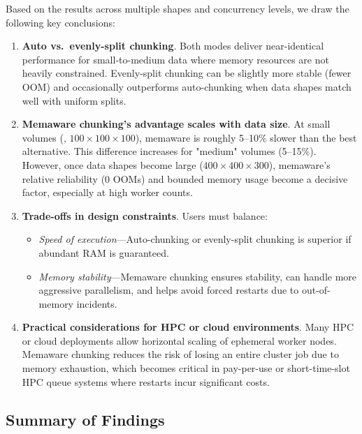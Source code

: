 Based on the results across multiple shapes and concurrency levels, we draw the following key conclusions:

\begin{enumerate}
    \item \textbf{Auto vs.\ evenly-split chunking}. Both modes deliver near-identical performance for small-to-medium data where memory resources are not heavily constrained. Evenly-split chunking can be slightly more stable (fewer \ac{OOM}) and occasionally outperforms auto-chunking when data shapes match well with uniform splits.

    \item \textbf{Memaware chunking's advantage scales with data size}. At small volumes (\eg, \(100 \times 100 \times 100\)), memaware is roughly 5--10\% slower than the best alternative. This difference increases for "medium" volumes (5--15\%). However, once data shapes become large (\(400 \times 400 \times 300\)), memaware's relative reliability (0 \ac{OOM}s) and bounded memory usage become a decisive factor, especially at high worker counts.

    \item \textbf{Trade-offs in design constraints}. Users must balance:
    \begin{itemize}
        \item \emph{Speed of execution}---Auto-chunking or evenly-split chunking is superior if abundant RAM is guaranteed.
        \item \emph{Memory stability}---Memaware chunking ensures stability, can handle more aggressive parallelism, and helps avoid forced restarts due to out-of-memory incidents.
    \end{itemize}

    \item \textbf{Practical considerations for \ac{HPC} or cloud environments}.
    Many \ac{HPC} or cloud deployments allow horizontal scaling of ephemeral worker nodes.
    Memaware chunking reduces the risk of losing an entire cluster job due to memory exhaustion, which becomes critical in pay-per-use or short-time-slot \ac{HPC} queue systems where restarts incur significant costs.
\end{enumerate}

\subsection{Summary of Findings}
\label{subsec:summary-of-findings}

